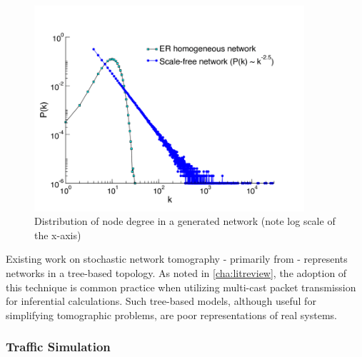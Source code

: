 \begin{figure}[t]
    \centering
    \includegraphics[width=10cm]{figs/intro/nodedegree-dist.png}
    \caption[Distribution of node degree in a generated network]{Distribution of node degree in a generated network (note log scale of the x-axis) \cite{baronchelli_networks_2013}}
    \label{fig:nddist}
\end{figure}
Existing work on stochastic network tomography - primarily from \cite{thoppe_stochastic_2014} \cite{kolar_distributed_2020} - represents networks in a tree-based topology. As noted in \cref{cha:litreview}, the adoption of this technique is common practice when utilizing multi-cast packet transmission for inferential calculations. Such tree-based models, although useful for simplifying tomographic problems, are poor representations of real systems.

\subsubsection*{Traffic Simulation}
\label{sssec:Itrafficsimulation}

